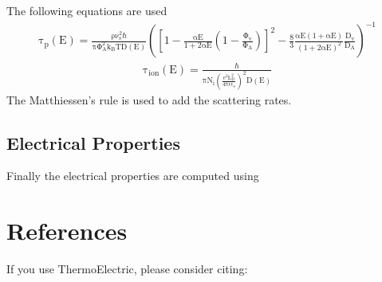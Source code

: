 \documentclass[letterpaper,10pt,english]{sphinxmanual}
\begin{document}
\sphinxAtStartPar
The following equations are used
\begin{equation*}
\begin{split}\mathrm{\tau_p(E)=\frac{\rho \nu_s^2 \hbar}{\pi \Phi_A^2 k_B T D(E)} \left ( \left[1-\frac{\alpha E}{1+2\alpha E}
        \left(1-\frac{\Phi_v}{\Phi_A} \right)\right]^2-\frac{8}{3} \frac{\alpha E(1+ \alpha E)}{(1+2 \alpha E)^2}
        \frac{D_v}{D_A} \right)^{-1}}\end{split}
\end{equation*}\begin{equation*}
\begin{split}\mathrm{\tau_{ion}(E)=\frac{\hbar}{\pi N_i \left(\frac{e^2 L_D^2}{4\pi \epsilon \epsilon_o}\right)^2 D(E)}}\end{split}
\end{equation*}
\sphinxAtStartPar
The Matthiessen’s rule is used to add the scattering rates.


\subsection{Electrical Properties}
\label{\detokenize{getting_started:electrical-properties}}
\sphinxAtStartPar
Finally the electrical properties are computed using

\begin{sphinxVerbatim}[commandchars=\\\{\}]
             \PYG{p}{[}\PYG{p}{]}\PYG{p}{[} \PYG{p}{]}
                                        \PYG{p}{[}\PYG{p}{]}      
\end{sphinxVerbatim}


\section{References}
\label{\detokenize{ref:references}}\label{\detokenize{ref::doc}}
\sphinxAtStartPar
If you use ThermoElectric, please consider citing:
\end{document}

